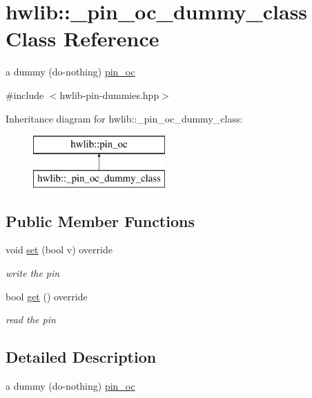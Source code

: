 \hypertarget{classhwlib_1_1__pin__oc__dummy__class}{}\section{hwlib\+:\+:\+\_\+pin\+\_\+oc\+\_\+dummy\+\_\+class Class Reference}
\label{classhwlib_1_1__pin__oc__dummy__class}


a dummy (do-\/nothing) \hyperlink{classhwlib_1_1pin__oc}{pin\+\_\+oc}  




{\ttfamily \#include $<$hwlib-\/pin-\/dummies.\+hpp$>$}

Inheritance diagram for hwlib\+:\+:\+\_\+pin\+\_\+oc\+\_\+dummy\+\_\+class\+:\begin{figure}[H]
\begin{center}
\leavevmode
\includegraphics[height=2.000000cm]{classhwlib_1_1__pin__oc__dummy__class}
\end{center}
\end{figure}
\subsection*{Public Member Functions}
\begin{DoxyCompactItemize}
\item 
void \hyperlink{classhwlib_1_1__pin__oc__dummy__class_a10db7f81b4ed0dc0573f039d97c1d69e}{set} (bool v) override
\begin{DoxyCompactList}\small\item\em write the pin \end{DoxyCompactList}\item 
bool \hyperlink{classhwlib_1_1__pin__oc__dummy__class_a06d061b7dd08d290e56969e90d4ff255}{get} () override
\begin{DoxyCompactList}\small\item\em read the pin \end{DoxyCompactList}\end{DoxyCompactItemize}


\subsection{Detailed Description}
a dummy (do-\/nothing) \hyperlink{classhwlib_1_1pin__oc}{pin\+\_\+oc} 

